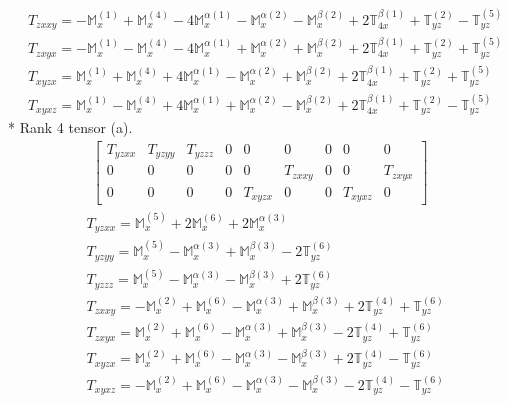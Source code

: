 \documentclass[fleqn,8pt,landscape]{jsarticle}
\begin{document}
\begin{align*}
& T_{zxxy} = - \mathbb{M}_{x}^{(1)} + \mathbb{M}_{x}^{(4)} - 4 \mathbb{M}_{x}^{\alpha(1)} - \mathbb{M}_{x}^{\alpha(2)} - \mathbb{M}_{x}^{\beta(2)} + 2 \mathbb{T}_{4x}^{\beta(1)} + \mathbb{T}_{yz}^{(2)} - \mathbb{T}_{yz}^{(5)} \\
& T_{zxyx} = - \mathbb{M}_{x}^{(1)} - \mathbb{M}_{x}^{(4)} - 4 \mathbb{M}_{x}^{\alpha(1)} + \mathbb{M}_{x}^{\alpha(2)} + \mathbb{M}_{x}^{\beta(2)} + 2 \mathbb{T}_{4x}^{\beta(1)} + \mathbb{T}_{yz}^{(2)} + \mathbb{T}_{yz}^{(5)} \\
& T_{xyzx} = \mathbb{M}_{x}^{(1)} + \mathbb{M}_{x}^{(4)} + 4 \mathbb{M}_{x}^{\alpha(1)} - \mathbb{M}_{x}^{\alpha(2)} + \mathbb{M}_{x}^{\beta(2)} + 2 \mathbb{T}_{4x}^{\beta(1)} + \mathbb{T}_{yz}^{(2)} + \mathbb{T}_{yz}^{(5)} \\
& T_{xyxz} = \mathbb{M}_{x}^{(1)} - \mathbb{M}_{x}^{(4)} + 4 \mathbb{M}_{x}^{\alpha(1)} + \mathbb{M}_{x}^{\alpha(2)} - \mathbb{M}_{x}^{\beta(2)} + 2 \mathbb{T}_{4x}^{\beta(1)} + \mathbb{T}_{yz}^{(2)} - \mathbb{T}_{yz}^{(5)}
\end{align*}
* Rank 4 tensor (a).
\begin{align*}
\begin{bmatrix} T_{yzxx} & T_{yzyy} & T_{yzzz} & 0 & 0 & 0 & 0 & 0 & 0 \\ 0 & 0 & 0 & 0 & 0 & T_{zxxy} & 0 & 0 & T_{zxyx} \\ 0 & 0 & 0 & 0 & T_{xyzx} & 0 & 0 & T_{xyxz} & 0 \end{bmatrix}
\end{align*}
\begin{align*}
& T_{yzxx} = \mathbb{M}_{x}^{(5)} + 2 \mathbb{M}_{x}^{(6)} + 2 \mathbb{M}_{x}^{\alpha(3)} \\
& T_{yzyy} = \mathbb{M}_{x}^{(5)} - \mathbb{M}_{x}^{\alpha(3)} + \mathbb{M}_{x}^{\beta(3)} - 2 \mathbb{T}_{yz}^{(6)} \\
& T_{yzzz} = \mathbb{M}_{x}^{(5)} - \mathbb{M}_{x}^{\alpha(3)} - \mathbb{M}_{x}^{\beta(3)} + 2 \mathbb{T}_{yz}^{(6)} \\
& T_{zxxy} = - \mathbb{M}_{x}^{(2)} + \mathbb{M}_{x}^{(6)} - \mathbb{M}_{x}^{\alpha(3)} + \mathbb{M}_{x}^{\beta(3)} + 2 \mathbb{T}_{yz}^{(4)} + \mathbb{T}_{yz}^{(6)} \\
& T_{zxyx} = \mathbb{M}_{x}^{(2)} + \mathbb{M}_{x}^{(6)} - \mathbb{M}_{x}^{\alpha(3)} + \mathbb{M}_{x}^{\beta(3)} - 2 \mathbb{T}_{yz}^{(4)} + \mathbb{T}_{yz}^{(6)} \\
& T_{xyzx} = \mathbb{M}_{x}^{(2)} + \mathbb{M}_{x}^{(6)} - \mathbb{M}_{x}^{\alpha(3)} - \mathbb{M}_{x}^{\beta(3)} + 2 \mathbb{T}_{yz}^{(4)} - \mathbb{T}_{yz}^{(6)} \\
& T_{xyxz} = - \mathbb{M}_{x}^{(2)} + \mathbb{M}_{x}^{(6)} - \mathbb{M}_{x}^{\alpha(3)} - \mathbb{M}_{x}^{\beta(3)} - 2 \mathbb{T}_{yz}^{(4)} - \mathbb{T}_{yz}^{(6)}
\end{align*}
\end{document}
